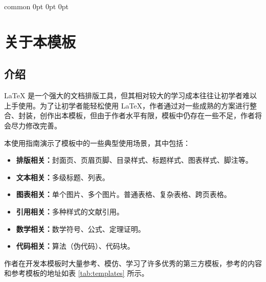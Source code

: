 \documentclass[report, twoside, UTF8, AutoFakeBold = 1, AutoFakeSlant, zihao = -4]{config}
\begin{document}
\Footer
    {common} %
    {0pt} %
    {0pt} %
    {0pt} %
    {} %
    {\thepage} %
    {} %




\chapter{关于本模板}

\section{介绍}

\LaTeX{} 是一个强大的文档排版工具，但其相对较大的学习成本往往让初学者难以上手使用。为了让初学者能轻松使用 \LaTeX{}，作者通过对一些成熟的方案进行整合、封装，创作出本模板，但由于作者水平有限，模板中仍存在一些不足，作者将会尽力修改完善。

本使用指南演示了模板中的一些典型使用场景，其中包括：

\begin{itemize}
    \item \textbf{排版相关：}封面页、页眉页脚、目录样式、标题样式、图表样式、脚注等。
    \item \textbf{文本相关：}多级标题、列表。
    \item \textbf{图表相关：}单个图片、多个图片。普通表格、复杂表格、跨页表格。
    \item \textbf{引用相关：}多种样式的文献引用。
    \item \textbf{数学相关：}数学符号、公式、定理证明。
    \item \textbf{代码相关：}算法（伪代码）、代码块。
\end{itemize}

作者在开发本模板时大量参考、模仿、学习了许多优秀的第三方模板，参考的内容和参考模板的地址如表 \ref{tab:templates} 所示。
\end{document}
